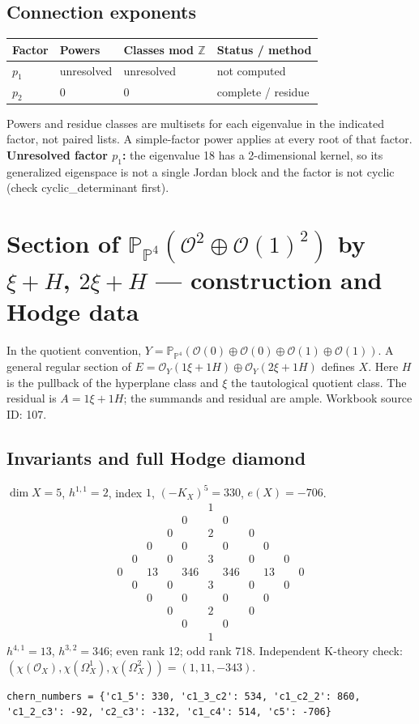 \documentclass[10pt,a4paper]{article}
\begin{document}
\subsection*{Connection exponents}
\begin{center}\begin{tabular}{llll}\toprule Factor & Powers & Classes mod $\mathbb Z$ & Status / method\\\midrule
$p_{1}$ & unresolved & unresolved & not computed\\
$p_{2}$ & $0$ & $0$ & complete / residue\\
\bottomrule\end{tabular}\end{center}
Powers and residue classes are multisets for each eigenvalue in the indicated factor, not paired lists. A simple-factor power applies at every root of that factor.
\textbf{Unresolved factor $p_{1}$:} the eigenvalue 18 has a 2-dimensional kernel, so its generalized eigenspace is not a single Jordan block and the factor is not cyclic (check cyclic\_determinant first).
\clearpage\section*{Section of $\mathbb P_{\mathbb P^{4}}(\mathcal O^{2}\oplus \mathcal O(1)^{2})$ by $\xi +H$, $2\xi +H$ --- construction and Hodge data}\label{entry:PB5-107}
In the quotient convention, $Y=\mathbb P_{\mathbb P^{4}}(\mathcal O(0)\oplus\mathcal O(0)\oplus\mathcal O(1)\oplus\mathcal O(1))$.
A general regular section of $E=\mathcal O_Y(1\xi+1H)\oplus\mathcal O_Y(2\xi+1H)$ defines $X$.
Here $H$ is the pullback of the hyperplane class and $\xi$ the tautological quotient class. The residual is $A=1\xi+1H$; the summands and residual are ample.
Workbook source ID: 107.
\subsection*{Invariants and full Hodge diamond}
$\dim X=5$, $h^{1,1}=2$, index $1$, $(-K_X)^5=330$, $e(X)=-706$.
\[\begin{array}{ccccccccccc}&&&&&1&&&&&\\&&&&0&&0&&&&\\&&&0&&2&&0&&&\\&&0&&0&&0&&0&&\\&0&&0&&3&&0&&0&\\0&&13&&346&&346&&13&&0\\&0&&0&&3&&0&&0&\\&&0&&0&&0&&0&&\\&&&0&&2&&0&&&\\&&&&0&&0&&&&\\&&&&&1&&&&&\end{array}\]
$h^{4,1}=13$, $h^{3,2}=346$; even rank 12; odd rank 718.
Independent K-theory check: $(\chi(\mathcal O_X),\chi(\Omega_X^1),\chi(\Omega_X^2))=(1, 11, -343)$.
\begin{lstlisting}
chern_numbers = {'c1_5': 330, 'c1_3_c2': 534, 'c1_c2_2': 860, 'c1_2_c3': -92, 'c2_c3': -132, 'c1_c4': 514, 'c5': -706}
\end{lstlisting}
\end{document}
